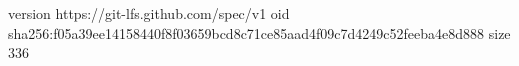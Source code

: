 version https://git-lfs.github.com/spec/v1
oid sha256:f05a39ee14158440f8f03659bcd8c71ce85aad4f09c7d4249c52feeba4e8d888
size 336
